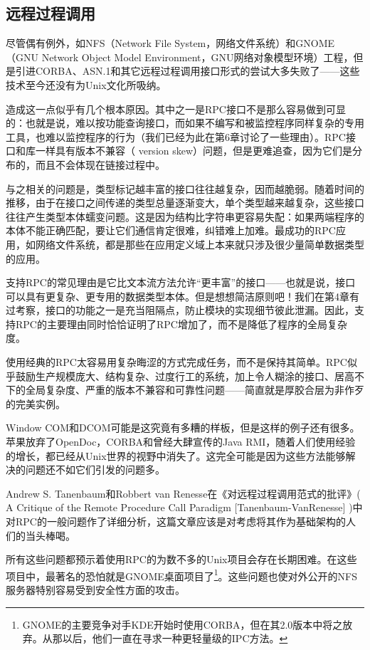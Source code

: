 \documentclass[12pt,oneside]{book}
\begin{document}
\begin{common-format}
\subsection{远程过程调用}
尽管偶有例外，如NFS（Network File System，网络文件系统）和GNOME （GNU Network Object Model Environment，GNU网络对象模型环境）工程，但是引进CORBA、ASN.1和其它远程过程调用接口形式的尝试大多失败了——这些技术至今还没有为Unix文化所吸纳。

造成这一点似乎有几个根本原因。其中之一是RPC接口不是那么容易做到可显的：也就是说，难以按功能查询接口，而如果不编写和被监控程序同样复杂的专用工具，也难以监控程序的行为（我们已经为此在第6章讨论了一些理由）。RPC接口和库一样具有版本不兼容（ version skew）问题，但是更难追查，因为它们是分布的，而且不会体现在链接过程中。

与之相关的问题是，类型标记越丰富的接口往往越复杂，因而越脆弱。随着时间的推移，由于在接口之间传递的类型总量逐渐变大，单个类型越来越复杂，这些接口往往产生类型本体蠕变问题。这是因为结构比字符串更容易失配：如果两端程序的本体不能正确匹配，要让它们通信肯定很难，纠错难上加难。最成功的RPC应用，如网络文件系统，都是那些在应用定义域上本来就只涉及很少量简单数据类型的应用。

支持RPC的常见理由是它比文本流方法允许“更丰富”的接口——也就是说，接口可以具有更复杂、更专用的数据类型本体。但是想想简洁原则吧！我们在第4章有过考察，接口的功能之一是充当阻隔点，防止模块的实现细节彼此泄漏。因此，支持RPC的主要理由同时恰恰证明了RPC增加了，而不是降低了程序的全局复杂度。

使用经典的RPC太容易用复杂晦涩的方式完成任务，而不是保持其简单。RPC似乎鼓励生产规模庞大、结构复杂、过度行工的系统，加上令人糊涂的接口、居高不下的全局复杂度、严重的版本不兼容和可靠性问题——简直就是厚胶合层为非作歹的完美实例。

Window COM和DCOM可能是这究竟有多糟的样板，但是这样的例子还有很多。苹果放弃了OpenDoc，CORBA和曾经大肆宣传的Java RMI，随着人们使用经验的增长，都已经从Unix世界的视野中消失了。这完全可能是因为这些方法能够解决的问题还不如它们引发的问题多。

Andrew S. Tanenbaum和Robbert van Renesse在《对远程过程调用范式的批评》( A Critique of the Remote Procedure Call Paradigm [Tanenbaum-VanRenesse] )中对RPC的一般问题作了详细分析，这篇文章应该是对考虑将其作为基础架构的人们的当头棒喝。

所有这些问题都预示着使用RPC的为数不多的Unix项目会存在长期困难。在这些项目中，最著名的恐怕就是GNOME桌面项目了\footnote{GNOME的主要竞争对手KDE开始时使用CORBA，但在其2.0版本中将之放弃。从那以后，他们一直在寻求一种更轻量级的IPC方法。}。这些问题也使对外公开的NFS服务器特别容易受到安全性方面的攻击。


\end{common-format}
\end{document}
